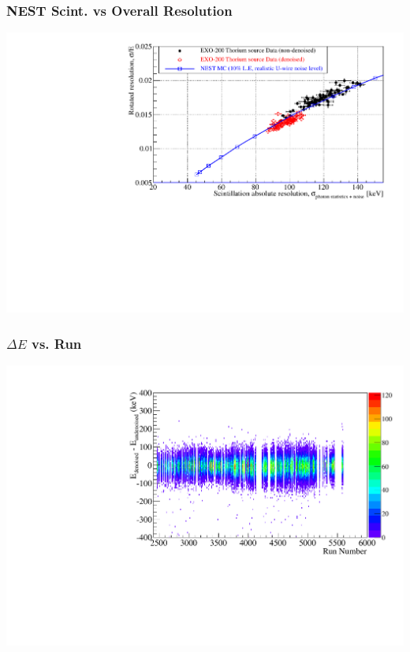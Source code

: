 \documentclass{beamer}
\begin{document}
\begin{frame}
\begin{center}
\frametitle{NEST Scint. vs Overall Resolution}
\end{center}
\begin{center}
\includegraphics[keepaspectratio=true,width=\textwidth]{resoDataMC_800eRMSInIonization_Comp.pdf}
\end{center}
\end{frame}

\begin{frame}
\begin{center}
\frametitle{$\Delta E$ vs. Run}
\end{center}
\vspace{0.5cm}
\begin{center}
\includegraphics[keepaspectratio=true,width=\textwidth]{EventComparison_diff_vs_run.pdf}
\end{center}
\end{frame}

\end{document}

